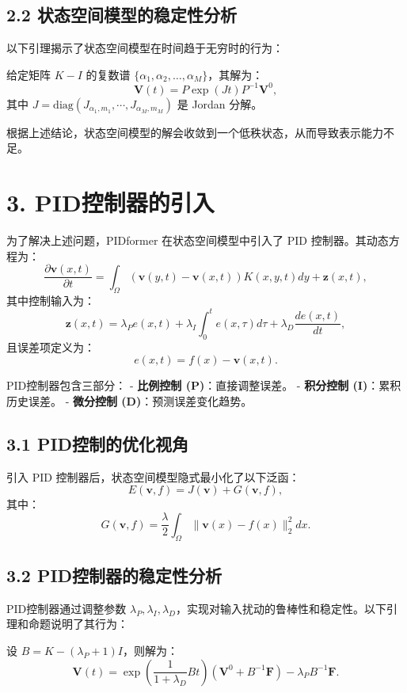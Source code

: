 \documentclass[lang=cn,a4paper,newtx]{elegantpaper}
\begin{document}
\subsection*{2.2 状态空间模型的稳定性分析}

以下引理揭示了状态空间模型在时间趋于无穷时的行为：

\begin{lemma}
给定矩阵 $K - I$ 的复数谱 $\{\alpha_1, \alpha_2, \dots, \alpha_M\}$，其解为：
\[
\mathbf{V}(t) = P \exp(J t) P^{-1} \mathbf{V}^0,
\]
其中 $J = \text{diag}(J_{\alpha_1, m_1}, \cdots, J_{\alpha_M, m_M})$ 是 Jordan 分解。
\end{lemma}

根据上述结论，状态空间模型的解会收敛到一个低秩状态，从而导致表示能力不足。

\section*{3. PID控制器的引入}

为了解决上述问题，PIDformer 在状态空间模型中引入了 PID 控制器。其动态方程为：
\[
\frac{\partial \mathbf{v}(x, t)}{\partial t} = \int_\Omega (\mathbf{v}(y, t) - \mathbf{v}(x, t)) K(x, y, t) dy + \mathbf{z}(x, t),
\]
其中控制输入为：
\[
\mathbf{z}(x, t) = \lambda_P e(x, t) + \lambda_I \int_0^t e(x, \tau) d\tau + \lambda_D \frac{d e(x, t)}{dt},
\]
且误差项定义为：
\[
e(x, t) = f(x) - \mathbf{v}(x, t).
\]

PID控制器包含三部分：
- \textbf{比例控制 (P)}：直接调整误差。
- \textbf{积分控制 (I)}：累积历史误差。
- \textbf{微分控制 (D)}：预测误差变化趋势。

\subsection*{3.1 PID控制的优化视角}

引入 PID 控制器后，状态空间模型隐式最小化了以下泛函：
\[
E(\mathbf{v}, f) = J(\mathbf{v}) + G(\mathbf{v}, f),
\]
其中：
\[
G(\mathbf{v}, f) = \frac{\lambda}{2} \int_\Omega \|\mathbf{v}(x) - f(x)\|_2^2 dx.
\]

\subsection*{3.2 PID控制器的稳定性分析}

PID控制器通过调整参数 $\lambda_P, \lambda_I, \lambda_D$，实现对输入扰动的鲁棒性和稳定性。以下引理和命题说明了其行为：

\begin{lemma}
设 $B = K - (\lambda_P + 1)I$，则解为：
\[
\mathbf{V}(t) = \exp\left(\frac{1}{1 + \lambda_D} Bt\right) \left(\mathbf{V}^0 + B^{-1} \mathbf{F}\right) - \lambda_P B^{-1} \mathbf{F}.
\]
\end{lemma}
\end{document}
